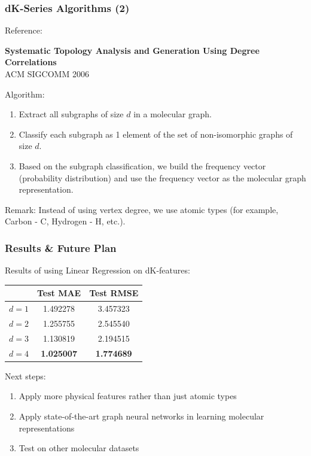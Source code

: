 \documentclass{beamer}
\begin{document}
\begin{frame}
\frametitle{dK-Series Algorithms (2)}
\begin{justify}
Reference: 
\begin{center}
\textbf{Systematic Topology Analysis and Generation Using Degree Correlations} \\ ACM SIGCOMM 2006
\end{center}
Algorithm:
\begin{enumerate}
	\item Extract all subgraphs of size $d$ in a molecular graph.
	\item Classify each subgraph as 1 element of the set of non-isomorphic graphs of size $d$.
	\item Based on the subgraph classification, we build the frequency vector (probability distribution) and use the frequency vector as the molecular graph representation. 
\end{enumerate}
Remark: Instead of using vertex degree, we use atomic types (for example, Carbon - C, Hydrogen - H, etc.).
\end{justify}
\end{frame}

\begin{frame}
\frametitle{Results \& Future Plan}
\begin{justify}
Results of using Linear Regression on dK-features:
\begin{center}
\begin{tabular}{|| c | c | c ||} 
\hline
& Test MAE & Test RMSE \\
\hline
$d = 1$ & 1.492278 & 3.457323 \\
\hline
$d = 2$ & 1.255755 & 2.545540 \\
\hline
$d = 3$ & 1.130819 & 2.194515 \\
\hline 
$d = 4$ & \textbf{1.025007} & \textbf{1.774689} \\
\hline
\end{tabular}
\end{center}
Next steps:
\begin{enumerate}
\item Apply more physical features rather than just atomic types
\item Apply state-of-the-art graph neural networks in learning molecular representations
\item Test on other molecular datasets
\end{enumerate}
\end{justify}
\end{frame}
\end{document}

